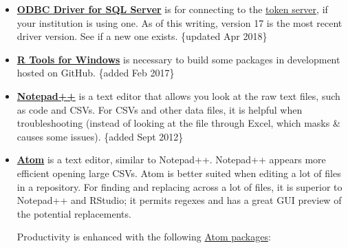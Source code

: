 \documentclass[]{book}
\begin{document}
\begin{itemize}
\item
  \textbf{\href{https://docs.microsoft.com/en-us/sql/connect/odbc/download-odbc-driver-for-sql-server}{ODBC Driver for SQL Server}} is for connecting to the \href{https://github.com/OuhscBbmc/REDCapR/blob/master/vignettes/SecurityDatabase.Rmd}{token server}, if your institution is using one. As of this writing, version 17 is the most recent driver version. See if a new one exists. \{updated Apr 2018\}
\item
  \textbf{\href{https://cran.r-project.org/bin/windows/Rtools/}{R Tools for Windows}} is necessary to build some packages in development hosted on GitHub. \{added Feb 2017\}
\item
  \textbf{\href{http://notepad-plus-plus.org/}{Notepad++}} is a text editor that allows you look at the raw text files, such as code and CSVs. For CSVs and other data files, it is helpful when troubleshooting (instead of looking at the file through Excel, which masks \& causes some issues). \{added Sept 2012\}
\item
  \textbf{\href{https://atom.io/}{Atom}} is a text editor, similar to Notepad++. Notepad++ appears more efficient opening large CSVs. Atom is better suited when editing a lot of files in a repository. For finding and replacing across a lot of files, it is superior to Notepad++ and RStudio; it permits regexes and has a great GUI preview of the potential replacements.

  Productivity is enhanced with the following \href{https://atom.io/packages}{Atom packages}:


\end{itemize}
\end{document}
